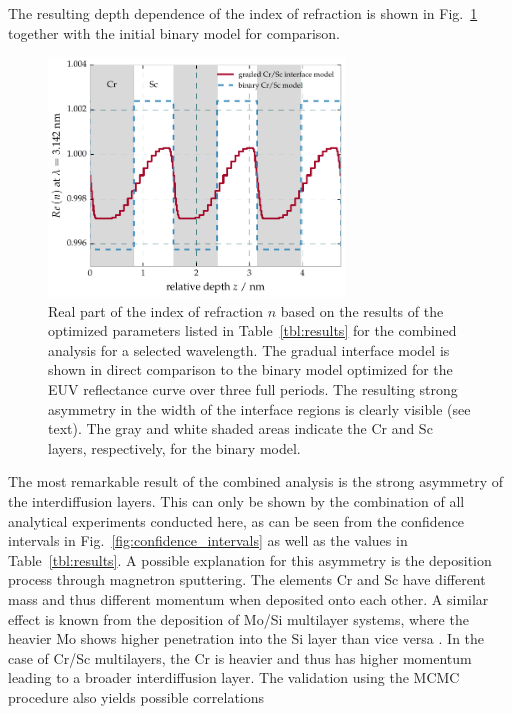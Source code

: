 The resulting depth dependence of the index of refraction is shown in 
Fig.~\ref{fig:electron_density_profile} together with the initial binary model 
for comparison.
\begin{figure}[htbp]
  \centering
  \includegraphics[width=0.7\textwidth]{img/CrSc_binary_vs_fitted_gradual_model}
  \caption{Real part of the index of refraction $n$  based on the results of 
the optimized parameters listed in Table~\ref{tbl:results} for the combined 
analysis for a selected wavelength. The gradual interface model is shown in 
direct comparison to the binary model optimized for the EUV reflectance curve 
over three full periods. The resulting strong asymmetry in the width of the 
interface regions is clearly visible (see text). The gray and white shaded 
areas indicate the Cr and Sc layers, respectively, for the binary model.}
  \label{fig:electron_density_profile}
\end{figure}
The most remarkable result of the combined analysis is the strong asymmetry of 
the interdiffusion layers. This can only be shown by the combination of all 
analytical experiments conducted here, as can be seen from the confidence 
intervals in Fig.~\ref{fig:confidence_intervals} as well as the values in 
Table~\ref{tbl:results}. A possible explanation for this asymmetry is the 
deposition process through magnetron sputtering. The elements Cr and Sc have 
different mass and thus different momentum when deposited onto each other. A 
similar effect is known from the deposition of Mo/Si multilayer systems, where 
the heavier Mo shows higher penetration into the Si layer than vice versa 
\cite{petford-long_highresolution_1987}. In the case of Cr/Sc multilayers, the Cr is heavier and 
thus has higher momentum leading to a broader interdiffusion layer.
The validation using the MCMC procedure also yields possible correlations 

